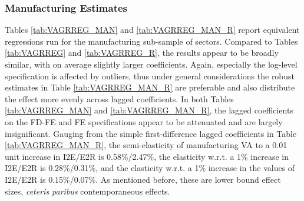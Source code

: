 \documentclass[a4paper]{article}
\begin{document}
\subsubsection*{Manufacturing Estimates}

Tables \ref{tab:VAGRREG_MAN} and \ref{tab:VAGRREG_MAN_R} report equivalent regressions run for the manufacturing sub-sample of sectors. Compared to Tables \ref{tab:VAGRREG} and \ref{tab:VAGRREG_R}, the results appear to be broadly similar, with on average slightly larger coefficients. Again, especially the log-level specification is affected by outliers, thus under general considerations the robust estimates in Table \ref{tab:VAGRREG_MAN_R} are preferable and also distribute the effect more evenly across lagged coefficients. In both Tables \ref{tab:VAGRREG_MAN} and \ref{tab:VAGRREG_MAN_R}, the lagged coefficients on the FD-FE and FE specifications appear to be attenuated and are largely insignificant. Gauging from the simple first-difference lagged coefficients in Table \ref{tab:VAGRREG_MAN_R}, the semi-elasticity of manufacturing VA to a 0.01 unit increase in I2E/E2R is 0.58\%/2.47\%, the elasticity w.r.t. a 1\% increase in I2E/E2R is 0.28\%/0.31\%, and the elasticity w.r.t. a 1\% increase in the values of I2E/E2R is 0.15\%/0.07\%. As mentioned before, these are lower bound effect sizes, \textit{ceteris paribus} contemporaneous effects. %
\end{document}
